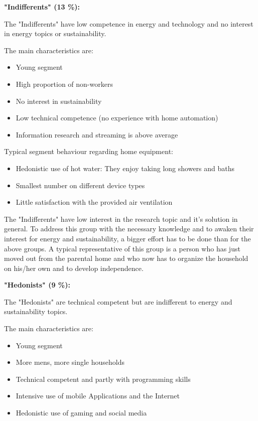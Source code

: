 \textbf{"Indifferents" (13 \%):}

The "Indifferents" have low competence in energy and technology and no interest in energy topics or sustainability.

The main characteristics are:
\begin{itemize}
	\item Young segment
	\item High proportion of non-workers
	\item No interest in sustainability
	\item Low technical competence (no experience with home automation)
	\item Information research and streaming is above average
\end{itemize}

Typical segment behaviour regarding home equipment:
\begin{itemize}
	\item Hedonistic use of hot water: They enjoy taking long showers and baths
	\item Smallest number on different device types
	\item Little satisfaction with the provided air ventilation
\end{itemize}

The "Indifferents" have low interest in the research topic and it's solution in general. To address this group with the necessary knowledge and to awaken their interest for energy and sustainability, a bigger effort has to be done than for the above groups. A typical representative of this group is a person who has just moved out from the parental home and who now has to organize the household on his/her own and to develop independence.

\textbf{"Hedonists" (9 \%):}

The "Hedonists" are technical competent but are indifferent to energy and sustainability topics.

The main characteristics are:
\begin{itemize}
	\item Young segment
	\item More mens, more single households
	\item Technical competent and partly with programming skills
	\item Intensive use of mobile Applications and the Internet
	\item Hedonistic use of gaming and social media
\end{itemize}

